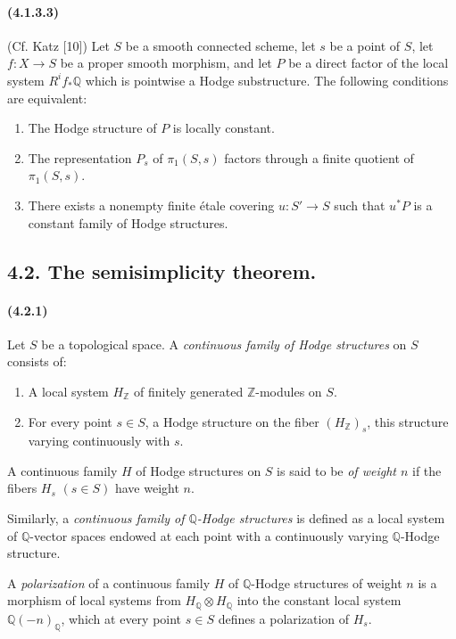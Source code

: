 \documentclass[10pt]{article}
\newcommand{\Q}{\mathbb Q}
\newcommand{\Z}{\mathbb Z}
\begin{document}
\paragraph{(4.1.3.3)} (Cf. Katz [10]) Let $S$ be a smooth connected scheme, let $s$ be a point of $S$, let $f:X\to S$ be a proper smooth morphism, and let $P$ be a direct factor of the local system $R^if_*\Q$ which is pointwise a Hodge substructure. The following conditions are equivalent:
\begin{enumerate}[label=\alph*)]
\item The Hodge structure of $P$ is locally constant.
\item The representation $P_s$ of $\pi_1(S,s)$ factors through a finite quotient of $\pi_1(S,s)$.
\item There exists a nonempty finite étale covering $u:S'\to S$ such that $u^*P$ is a constant family of Hodge structures.
\end{enumerate}

\subsection*{4.2. The semisimplicity theorem.}

\paragraph{(4.2.1)} Let $S$ be a topological space. A \emph{continuous family of Hodge structures} on $S$ consists of:
\begin{enumerate}[label=\alph*)]
\item A local system $H_\Z$ of finitely generated $\Z$-modules on $S$.
\item For every point $s\in S$, a Hodge structure on the fiber $(H_\Z)_s$, this structure varying continuously with $s$.
\end{enumerate}
A continuous family $H$ of Hodge structures on $S$ is said to be \emph{of weight $n$} if the fibers $H_s$ $(s\in S)$ have weight $n$.

Similarly, a \emph{continuous family of $\Q$-Hodge structures} is defined as a local system of $\Q$-vector spaces endowed at each point with a continuously varying $\Q$-Hodge structure.

A \emph{polarization} of a continuous family $H$ of $\Q$-Hodge structures of weight $n$ is a morphism of local systems from $H_\Q\otimes H_\Q$ into the constant local system $\Q(-n)_\Q$, which at every point $s\in S$ defines a polarization of $H_s$.
\end{document}
